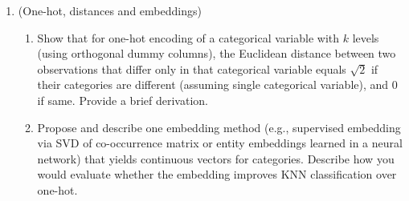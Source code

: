 \documentclass[12pt,a4paper]{article}
\begin{document}
\begin{enumerate}[label=(\arabic*)]
\item (One-hot, distances and embeddings)
    \begin{enumerate}[label=(\alph*)]
    \item Show that for one-hot encoding of a categorical variable with \(k\) levels (using orthogonal dummy columns), the Euclidean distance between two observations that differ only in that categorical variable equals \(\sqrt{2}\) if their categories are different (assuming single categorical variable), and 0 if same. Provide a brief derivation.
    \item Propose and describe one embedding method (e.g., supervised embedding via SVD of co-occurrence matrix or entity embeddings learned in a neural network) that yields continuous vectors for categories. Describe how you would evaluate whether the embedding improves KNN classification over one-hot.
    \end{enumerate}


\end{enumerate}
\end{document}
